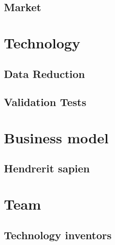 \chapter{Market} \label{ch:hendrerit}

\newpage
%
%

\part{Technology}
\newpage
\chapter{Data Reduction} \label{ch:hendrerit}

\chapter{Validation Tests} \label{ch:hendrerit}


\part{Business model}
\newpage
\chapter{Hendrerit sapien} \label{ch:hendrerit}

\newpage



\part{Team}
\newpage
\chapter{Technology inventors} \label{ch:hendrerit}

\newpage
%

